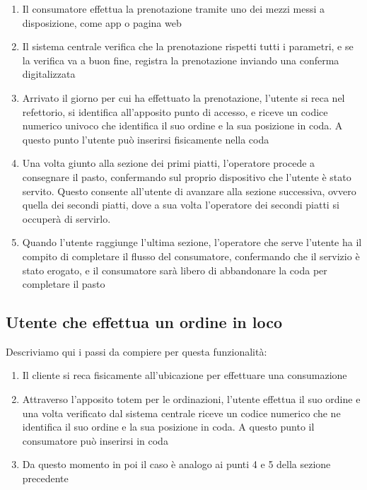 \documentclass[a4paper, titlepage, 12pt, openright, twoside]{book}
\begin{document}
\begin{enumerate}
	\item Il consumatore effettua la prenotazione tramite uno dei mezzi messi a disposizione, come app o pagina web
	\item Il sistema centrale verifica che la prenotazione rispetti tutti i parametri, e se la verifica va a buon fine, registra la prenotazione
		  inviando una conferma digitalizzata
	\item Arrivato il giorno per cui ha effettuato la prenotazione, l'utente si reca nel refettorio, si identifica all'apposito punto di accesso,
		  e riceve un codice numerico univoco che identifica il suo ordine e la sua posizione in coda. A questo punto l'utente può inserirsi fisicamente nella coda
	\item Una volta giunto alla sezione dei primi piatti, l'operatore procede a consegnare il pasto, confermando sul proprio dispositivo che l'utente è stato servito.
		  Questo consente all'utente di avanzare alla sezione successiva, ovvero quella dei secondi piatti, dove a sua volta l'operatore dei secondi piatti si occuperà di servirlo.
	\item Quando l'utente raggiunge l'ultima sezione, l'operatore che serve l'utente ha il compito di completare il flusso del consumatore, confermando che il servizio è stato erogato, e il consumatore sarà libero di abbandonare la coda per completare il pasto
\end{enumerate}

\subsection{Utente che effettua un ordine in loco}

Descriviamo qui i passi da compiere per questa funzionalità:

\begin{enumerate}
	\item Il cliente si reca fisicamente all'ubicazione per effettuare una consumazione
	\item Attraverso l'apposito totem per le ordinazioni, l'utente effettua il suo ordine e una volta verificato dal sistema centrale riceve un codice numerico che ne identifica il suo ordine e la sua posizione in coda. A questo punto il consumatore può inserirsi in coda
	\item Da questo momento in poi il caso è analogo ai punti 4 e 5 della sezione precedente
\end{enumerate}
\end{document}
